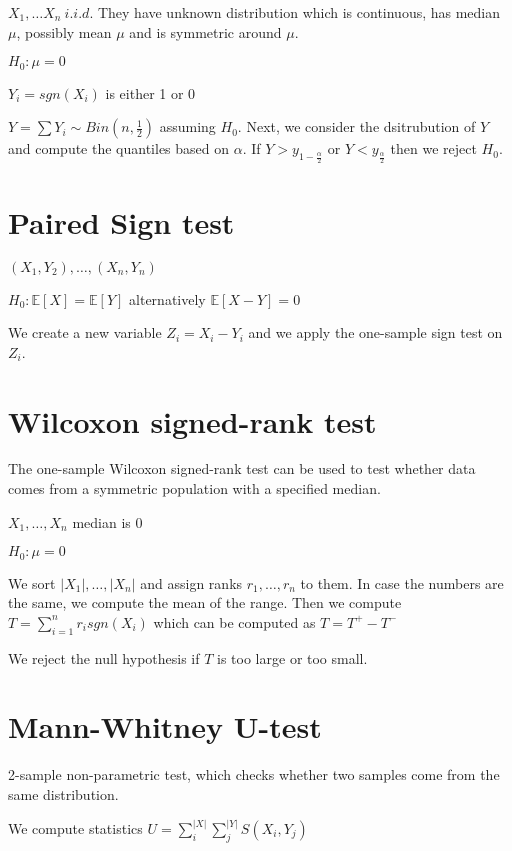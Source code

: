 $X_1, \dots X_n \ i.i.d. $ They have unknown distribution which is continuous, has median $\mu$, possibly mean $\mu$ and is symmetric around $\mu$.

$H_0: \mu = 0$

$Y_i = sgn(X_i)$ is either 1 or 0


$Y = \sum Y_i \sim Bin(n, \frac{1}{2})$ assuming $H_0$. Next, we consider the dsitrubution of $Y$ and compute the quantiles based on $\alpha$. If $Y > y_{1-\frac{\alpha}{2}}$ or $Y < y_{\frac{\alpha}{2}}$ then we reject $H_0$.

\section{Paired Sign test}

$(X_1, Y_2), \dots , (X_n, Y_n)$

$H_0 : \mathbb{E}[X]  = \mathbb{E}[Y]$ alternatively $\mathbb{E}[X-Y] = 0$

We create a new variable $Z_i = X_i - Y_i $ and we apply the one-sample sign test on $Z_i$.

\section{Wilcoxon signed-rank test}

The one-sample Wilcoxon signed-rank test can be used to test whether data comes from a symmetric population with a specified median.

$X_1, \dots, X_n$ median is $0$

$H_0: \mu = 0$

We sort $\vert X_1 \vert, \dots, \vert X_n \vert$ and assign ranks $r_1, \dots, r_n$ to them. In case the numbers are the same, we compute the mean of the range. Then we compute $T = \sum_{i=1}^n r_i sgn(X_i)$ which can be computed as $T = T^+ - T^-$

We reject the null hypothesis if $T$ is too large or too small.

\section{Mann-Whitney U-test}

2-sample non-parametric test, which checks whether two samples come from the same distribution.

We compute statistics $U = \sum^{|X|}_i \sum^{|Y|}_j S(X_i, Y_j)$

